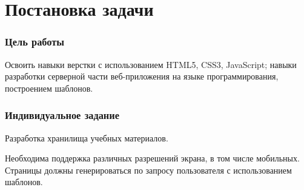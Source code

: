 \part{Постановка задачи}
\section{Цель работы}

Освоить навыки верстки с использованием HTML5, CSS3, JavaScript; навыки разработки серверной части веб-приложения на языке программирования, построением шаблонов.

\section{Индивидуальное  задание}

Разработка хранилища учебных материалов.

Необходима поддержка различных разрешений экрана, в том числе мобильных. Страницы должны генерироваться по запросу пользователя с использованием шаблонов.